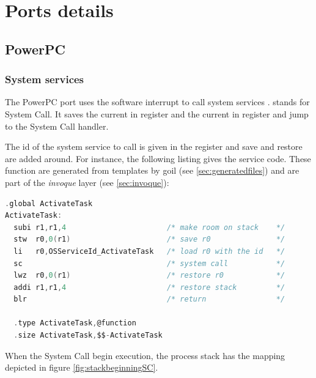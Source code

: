 
\chapter{Ports details}

\section{PowerPC}

\subsection{System services} \label{sec:systemservices}

The PowerPC port uses the  software interrupt to call system services \cite{mpc32bsc}.  stands for System Call. It saves the current  in  register and the current  in  register and jump to the System Call handler.

The id of the system service to call is given in the  register and  save and restore are added around. For instance, the following listing gives the  service code. These function are generated from templates by goil (see \ref{sec:generatedfiles}) and are part of the {\em invoque} layer (see \ref{sec:invoque}):

\begin{lstlisting}[language=C]
  .global ActivateTask
ActivateTask:
  subi r1,r1,4                       /* make room on stack    */
  stw  r0,0(r1)                      /* save r0               */
  li   r0,OSServiceId_ActivateTask   /* load r0 with the id   */
  sc                                 /* system call           */
  lwz  r0,0(r1)                      /* restore r0            */
  addi r1,r1,4                       /* restore stack         */
  blr                                /* return                */
  
  .type ActivateTask,@function
  .size ActivateTask,$$-ActivateTask
\end{lstlisting}

When the System Call begin execution, the process stack has the mapping depicted in figure \ref{fig:stackbeginningSC}.

